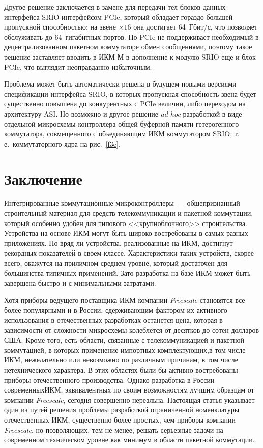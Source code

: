 \begin{multicols}{2}
Другое 
решение заключается в замене для передачи тел блоков данных интерфейса SRIO 
интерфейсом PCIe, который обладает гораздо большей пропускной способностью: на звене 
$\times 16$ она достигает 64~Гбит/с, что позволяет обслуживать до 64~гигабитных портов. 
Но PCIe не поддерживает необходимый в децентрализованном пакетном коммутаторе обмен 
сообщениями, поэтому такое решение заставляет вводить в ИКМ-М в дополнение к модулю 
SRIO еще и блок PCIe, что выглядит неоправданно избыточным. 

Проблема может быть 
автоматически решена в будущем новыми версиями спецификации интерфейса SRIO, в 
которых пропускная способность звена будет существенно повышена до конкурентных с 
PCIe величин, либо переходом на архитектуру ASI. Но возможно и другое решение \textit{ad hoc} 
разработкой в виде отдельной микросхемы контроллера общей буферной памяти 
гетерогенного коммутатора, совмещенного с объединяющим ИКМ коммутатором SRIO, т.\,е.\ 
коммутаторного ядра на рис.~\ref{f3e}.

\section{Заключение}

     Интегрированные коммутационные микроконтроллеры~--- общепризнанный строительный материал для средств телекоммуникации и 
пакетной коммутации, который особенно удобен для типового <<крупноблочного>> 
строительства. Устройства на основе ИКМ могут быть широко востребованы в самых 
разных приложениях. Но вряд ли устройства, реализованные на ИКМ, достигнут рекордных 
показателей в своем классе. Характеристики таких устройств, скорее всего, окажутся на 
приличном среднем уровне, который достаточен для большинства типичных применений. 
Зато разработка на базе ИКМ может быть завершена быстро и с минимальными затратами.
     
     Хотя приборы ведущего поставщика ИКМ компании \textit{Freescale} становятся все 
более популярными и в России, сдерживающим фактором их активного использования в 
отечественных разработках останется цена, которая в зависимости от сложности 
микросхемы колеблется от десятков до сотен долларов США. Кроме того, есть области, 
связанные с телекоммуникацией и пакетной коммутацией, в которых применение 
импортных комплектующих,\linebreak в том числе ИКМ, нежелательно или невозможно по 
различным причинам, в том числе нетехнического 
характера. В этих областях были бы 
активно востребованы приборы отечественного производства. %
Одна\-ко разработка в России 
современных\linebreak ИКМ, эквивалентных по своим возможностям лучшим образцам от компании 
\textit{Freescale}, сегодня совершенно нереальна. Настоящая статья указывает один из путей 
решения проблемы разработкой ограниченной номенклатуры отечественных ИКМ, 
существенно более простых, чем приборы компании \textit{Freescale}, но позволяющих, тем 
не менее, %
решать серь\-ез\-ные задачи на современном техническом уровне как минимум в 
области пакетной коммутации.
     

\end{multicols}
